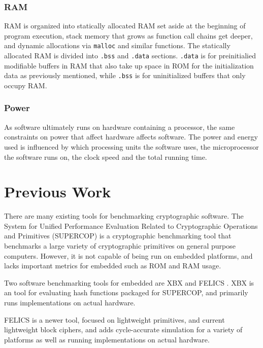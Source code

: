 \documentclass[twoside,11pt]{cergdoc}
\begin{document}
    \subsection{RAM}
RAM is organized into statically allocated RAM set aside at the beginning of
program execution, stack memory that grows as function call chains get deeper,
and dynamic allocations via \texttt{malloc} and similar functions. The statically
allocated RAM is divided into \texttt{.bss} and \texttt{.data} sections.
\texttt{.data} is for preinitialied modifiable buffers in RAM that also take up
space in ROM for the initialization data as previously mentioned, while
\texttt{.bss} is for uninitialized buffers that only occupy RAM.

    \subsection{Power}
As software ultimately runs on hardware containing a processor, the same
constraints on power that affect hardware affects software. The power and energy
used is influenced by which processing units the software uses, the
microprocessor the software runs on, the clock speed and the total running time.

\chapter{Previous Work}
There are many existing tools for benchmarking cryptographic software.
The System for Unified Performance Evaluation Related to Cryptographic Operations and Primitives
(SUPERCOP) is a cryptographic benchmarking tool that benchmarks a large variety
of cryptographic primitives on general purpose computers\cite{supercop}.
However, it is not capable of being run on embedded platforms, and lacks
important metrics for embedded such as ROM and RAM usage.

Two software benchmarking tools for embedded are XBX\cite{xbx} and
FELICS \cite{felics}\cite{dinu_triathlon}. XBX is an tool for evaluating
hash functions packaged for SUPERCOP, and primarily runs implementations on
actual hardware. 

FELICS is a newer tool, focused on lightweight primitives, and current
lightweight block ciphers, and adds cycle-accurate simulation for a variety of
platforms as well as running implementations on actual hardware. 
\end{document}
